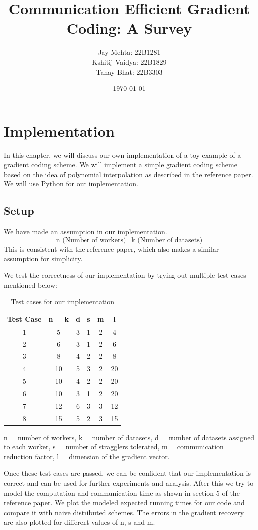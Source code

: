 \documentclass{report}
\title{Communication Efficient Gradient Coding: A Survey}
\author{Jay Mehta: 22B1281\\
        Kshitij Vaidya: 22B1829\\
        Tanay Bhat: 22B3303}
\date{\today}
\begin{document}
\maketitle

\tableofcontents
\chapter{Implementation}
In this chapter, we will discuss our own implementation of a toy example of a gradient coding scheme. We will implement a simple gradient coding scheme based on the idea of polynomial interpolation as described in the reference paper. We will use Python for our implementation.
\section{Setup}
We have made an assumption in our implementation.
\begin{equation*}
    \text{n (Number of workers)} = \text{k (Number of datasets)}
\end{equation*}
This is consistent with the reference paper, which also makes a similar assumption for simplicity. 

We test the correctness of our implementation by trying out multiple test cases mentioned below:
\begin{table}[!h]
    \centering
\begin{tabular}{c|c|c|c|c|c}
\hline
\textbf{Test Case} & \textbf{n = k} & \textbf{d} & \textbf{s} & \textbf{m} & \textbf{l} \\ \hline
1 & 5 & 3 & 1 & 2 & 4 \\
2 & 6 & 3 & 1 & 2 & 6 \\
3 & 8 & 4 & 2 & 2 & 8 \\
4 & 10 & 5 & 3 & 2 & 20 \\
5 & 10 & 4 & 2 & 2 & 20 \\
6 & 10 & 3 & 1 & 2 & 20 \\
7 & 12 & 6 & 3 & 3 & 12 \\
8 & 15 & 5 & 2 & 3 & 15 \\ 
\hline
\end{tabular}
\caption{Test cases for our implementation}
\end{table}

n = number of workers, k = number of datasets, d = number of datasets assigned to each worker, s = number of stragglers tolerated, m = communication reduction factor, l = dimension of the gradient vector.

Once these test cases are passed, we can be confident that our implementation is correct and can be used for further experiments and analysis. After this we try to model the computation and communication time as shown in section 5 of the reference paper. We plot the modeled expected running times for our code and compare it with naive distributed schemes. The errors in the gradient recovery are also plotted for different values of n, s and m. 
\end{document}
